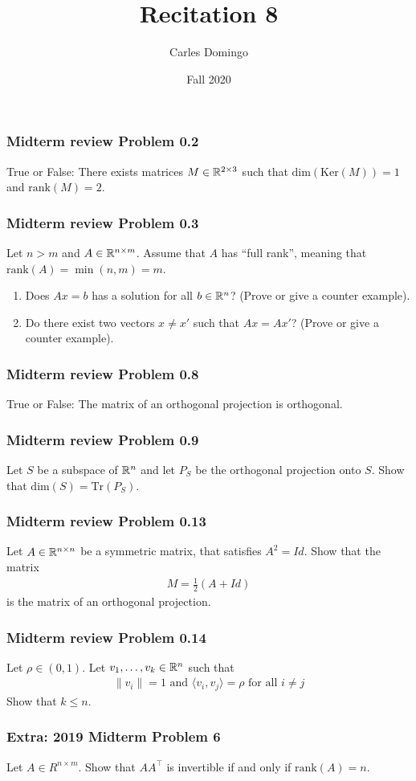 \documentclass{beamer}
\title{Recitation 8}
\author{Carles Domingo}
\date{Fall 2020}
\begin{document}
\frame{\titlepage} 

\setcounter{showProgressBar}{0}
\setcounter{showSlideNumbers}{1}

\begin{frame}[t]
\frametitle{Midterm review Problem 0.2}
True or False: There exists matrices $M \in \mathbb{R}^{2 \times 3}$ such that $\text{dim}(\text{Ker}(M)) = 1$ and $\text{rank}(M) = 2$.
\end{frame}

\begin{frame}[t]
\frametitle{Midterm review Problem 0.3}
Let $n > m$ and $A \in \mathbb{R}^{n \times m}$. Assume that $A$ has “full rank”, meaning that $\text{rank}(A) = \min(n, m) = m$.
\begin{enumerate}
\item Does $Ax=b$ has a solution for all $b \in \mathbb{R}^n$? (Prove or give a counter example).
\item Do there exist two vectors $x \neq x'$ such that $Ax = Ax'$? (Prove or give a counter example).
\end{enumerate}
\pause
\pause
\end{frame}

\begin{frame}[t]
\frametitle{Midterm review Problem 0.8}
True or False: The matrix of an orthogonal projection is orthogonal.
\pause
\end{frame}

\begin{frame}[t]
\frametitle{Midterm review Problem 0.9}
Let $S$ be a subspace of $\mathbb{R}^n$ and let $P_S$ be the orthogonal projection onto $S$. Show that $\text{dim}(S) = \text{Tr}(P_S)$.
\pause
\end{frame}

\begin{frame}[t]
\frametitle{Midterm review Problem 0.13}
Let $A \in \mathbb{R}^{n \times n}$ be a symmetric matrix, that satisfies $A^2 = Id$. Show that the matrix
\begin{align*}
M = \frac{1}{2}(A + Id)
\end{align*}
is the matrix of an orthogonal projection.
\pause
\end{frame}

\begin{frame}[t]
\frametitle{Midterm review Problem 0.14}
Let $\rho \in (0,1)$. Let $v_1, \dots, v_k \in \mathbb{R}^n$ such that
\begin{align*}
\|v_i\| = 1 \text{ and } \langle v_i, v_j \rangle = \rho \text{ for all } i \neq j
\end{align*}
Show that $k \leq n$.
\pause
\end{frame}

\begin{frame}[t]
\frametitle{Extra: 2019 Midterm Problem 6}
Let $A \in R^{n \times m}$. Show that $A A^{\top}$ is invertible if and only if $\text{rank}(A) = n$.
\pause
\end{frame}

\begin{frame}[t]

\pause
\end{frame}
\end{document}

